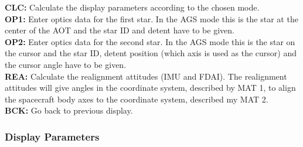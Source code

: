 \documentclass[11pt]{article} %
\begin{document}
\textbf{CLC:} Calculate the display parameters according to the chosen mode.\\
\textbf{OP1:} Enter optics data for the first star. In the AGS mode this is the star at the center of the AOT and the star ID and detent have to be given.\\
\textbf{OP2:} Enter optics data for the second star. In the AGS mode this is the star on the cursor and the star ID, detent position (which axis is used as the cursor) and the cursor angle have to be given.\\
\textbf{REA:} Calculate the realignment attitudes (IMU and FDAI). The realignment attitudes will give angles in the coordinate system, described by MAT 1, to align the spacecraft body axes to the coordinate system, described my MAT 2.\\
\textbf{BCK:} Go back to previous display.\\
\newpage
\subsubsection{Display Parameters}
\end{document}
